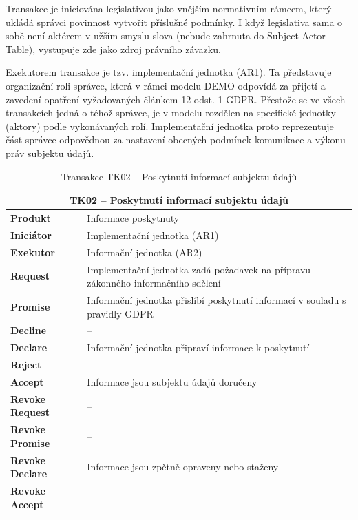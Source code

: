 \begin{itemize}
  Transakce je iniciována legislativou jako vnějším normativním rámcem, který ukládá správci povinnost vytvořit příslušné podmínky. I když legislativa sama o sobě není aktérem v užším smyslu slova (nebude zahrnuta do Subject-Actor Table), vystupuje zde jako zdroj právního závazku.

  Exekutorem transakce je tzv. implementační jednotka (AR1). Ta představuje organizační roli správce, která v rámci modelu DEMO odpovídá za přijetí a zavedení opatření vyžadovaných článkem 12 odst. 1 GDPR. Přestože se ve všech transakcích jedná o téhož správce, je v modelu rozdělen na specifické jednotky (aktory) podle vykonávaných rolí. Implementační jednotka proto reprezentuje část správce odpovědnou za nastavení obecných podmínek komunikace a výkonu práv subjektu údajů.


  \begin{table}[H]
    \centering
    \renewcommand{\arraystretch}{1.2}
    \begin{tabular}{|p{3.1cm}|p{9.9cm}|}
    \hline
    \multicolumn{2}{|c|}{\textbf{TK02 – Poskytnutí informací subjektu údajů}} \\
    \hline
    \textbf{Produkt} & Informace poskytnuty \\
    \hline
    \textbf{Iniciátor} & Implementační jednotka (AR1) \\
    \hline
    \textbf{Exekutor} & Informační jednotka (AR2) \\
    \hline
    \textbf{Request} & Implementační jednotka zadá požadavek na přípravu zákonného informačního sdělení \\
    \hline
    \textbf{Promise} & Informační jednotka přislíbí poskytnutí informací v souladu s pravidly GDPR \\
    \hline
    \textbf{Decline} & – \\
    \hline
    \textbf{Declare} & Informační jednotka připraví informace k poskytnutí \\
    \hline
    \textbf{Reject} & – \\
    \hline
    \textbf{Accept} & Informace jsou subjektu údajů doručeny \\
    \hline
    \textbf{Revoke Request} & – \\
    \hline
    \textbf{Revoke Promise} & – \\
    \hline
    \textbf{Revoke Declare} & Informace jsou zpětně opraveny nebo staženy \\
    \hline
    \textbf{Revoke Accept} & – \\
    \hline
    \end{tabular}
    \caption{Transakce TK02 – Poskytnutí informací subjektu údajů}
  \end{table}
  


\end{itemize}
